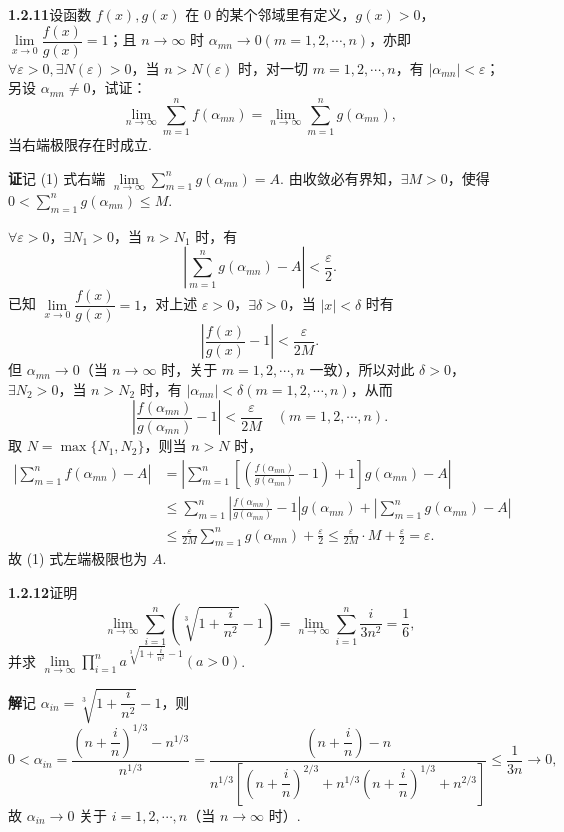 \documentclass[UTF8,12pt,a4paper,fontset=fandol]{ctexart}
\begin{document}
\noindent\textbf{1.2.11}\quad 设函数 $f(x),g(x)$ 在 $0$ 的某个邻域里有定义，$g(x)>0$，$\lim\limits_{x\to0}\dfrac{f(x)}{g(x)}=1$；且 $n\to\infty$ 时 $\alpha_{mn}\to0(m=1,2,\cdots,n)$，亦即 $\forall\varepsilon>0,\exists N(\varepsilon)>0$，当 $n>N(\varepsilon)$ 时，对一切 $m=1,2,\cdots,n$，有 $|\alpha_{mn}|<\varepsilon$；另设 $\alpha_{mn}\ne0$，试证：
\[
  \lim_{n\to\infty}\sum_{m=1}^n f(\alpha_{mn})
  =
  \lim_{n\to\infty}\sum_{m=1}^n g(\alpha_{mn}),
\tag{1}
\]
当右端极限存在时成立.

\noindent\textbf{证}\quad 记 (1) 式右端 $\lim\limits_{n\to\infty}\sum\limits_{m=1}^n g(\alpha_{mn})=A$. 由收敛必有界知，$\exists M>0$，使得 $0<\sum\limits_{m=1}^n g(\alpha_{mn})\le M$.

$\forall\varepsilon>0$，$\exists N_1>0$，当 $n>N_1$ 时，有
\[
  \left|\sum_{m=1}^n g(\alpha_{mn})-A\right|<\frac{\varepsilon}{2}.
\]
已知 $\lim\limits_{x\to0}\dfrac{f(x)}{g(x)}=1$，对上述 $\varepsilon>0$，$\exists\delta>0$，当 $|x|<\delta$ 时有
\[
  \left|\frac{f(x)}{g(x)}-1\right|<\frac{\varepsilon}{2M}.
\]
但 $\alpha_{mn}\to0$（当 $n\to\infty$ 时，关于 $m=1,2,\cdots,n$ 一致），所以对此 $\delta>0$，$\exists N_2>0$，当 $n>N_2$ 时，有 $|\alpha_{mn}|<\delta(m=1,2,\cdots,n)$，从而
\[
  \left|\frac{f(\alpha_{mn})}{g(\alpha_{mn})}-1\right|<\frac{\varepsilon}{2M}
  \quad(m=1,2,\cdots,n).
\]
取 $N=\max\{N_1,N_2\}$，则当 $n>N$ 时，
\[
\begin{aligned}
\left|\sum_{m=1}^n f(\alpha_{mn})-A\right|
&=\left|\sum_{m=1}^n\left[\left(\frac{f(\alpha_{mn})}{g(\alpha_{mn})}-1\right)+1\right]g(\alpha_{mn})-A\right|\\
&\le\sum_{m=1}^n\left|\frac{f(\alpha_{mn})}{g(\alpha_{mn})}-1\right|g(\alpha_{mn})
  +\left|\sum_{m=1}^n g(\alpha_{mn})-A\right|\\
&\le \frac{\varepsilon}{2M}\sum_{m=1}^n g(\alpha_{mn})+\frac{\varepsilon}{2}
\le\frac{\varepsilon}{2M}\cdot M+\frac{\varepsilon}{2}=\varepsilon.
\end{aligned}
\]
故 (1) 式左端极限也为 $A$.

\noindent\textbf{1.2.12}\quad 证明
\[
  \lim_{n\to\infty}\sum_{i=1}^n\left(\sqrt[3]{1+\frac{i}{n^2}}-1\right)
  =
  \lim_{n\to\infty}\sum_{i=1}^n\frac{i}{3n^2}
  =\frac16,
\]
并求 $\lim\limits_{n\to\infty}\prod\limits_{i=1}^n a^{\sqrt[3]{1+\frac{i}{n^2}}-1}(a>0)$.

\noindent\textbf{解}\quad 记 $\alpha_{in}=\sqrt[3]{1+\dfrac{i}{n^2}}-1$，则
\[
0<\alpha_{in}
=\frac{\left(n+\dfrac{i}{n}\right)^{1/3}-n^{1/3}}{n^{1/3}}
=\frac{\left(n+\dfrac{i}{n}\right)-n}
{n^{1/3}\left[\left(n+\dfrac{i}{n}\right)^{2/3}
+n^{1/3}\left(n+\dfrac{i}{n}\right)^{1/3}+n^{2/3}\right]}
\le\frac1{3n}\to0,
\]
故 $\alpha_{in}\to0$ 关于 $i=1,2,\cdots,n$（当 $n\to\infty$ 时）.
\end{document}
